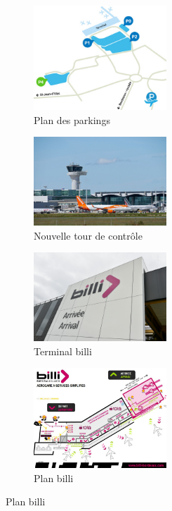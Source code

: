 \begin{figure}[hbt!]
    \begin{subfigure}{0.5\textwidth}
      \centering
      \includegraphics[width=5cm]{Images/parkings.jpg}  
      \caption{Plan des parkings}
      \label{fig:parking4}
    \end{subfigure}
    \begin{subfigure}{0.5\textwidth}
      \centering
      \includegraphics[width=5cm]{Images/tour.jpg}  
      \caption{Nouvelle tour de contrôle}
      \label{fig:tour}
    \end{subfigure}
        
    \begin{subfigure}{.5\textwidth}
      \centering
      \includegraphics[width=5cm]{Images/billiext.jpg}  
      \caption{Terminal billi}
      \label{fig:billiext}
    \end{subfigure}
    \begin{subfigure}{.5\textwidth}
      \centering
      \includegraphics[width=5cm]{Images/billi.jpg}  
      \caption{Plan billi}
      \label{fig:planBilli}
    \end{subfigure}
    \label{fig:travaux}
\end{figure}

